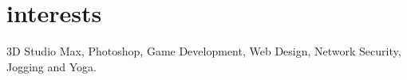 \documentclass[]{friggeri-cv}
\begin{document}
\section{interests}
    3D Studio Max, Photoshop, Game Development, Web Design, Network Security, Jogging and Yoga.




% 
\end{document}
